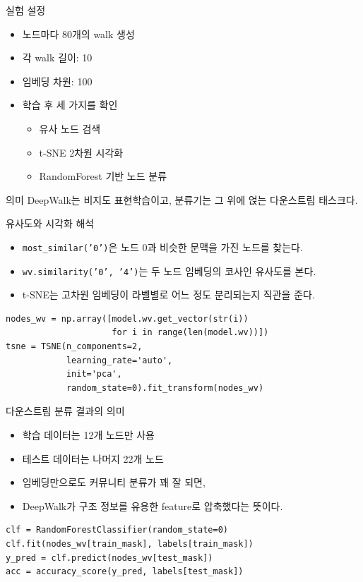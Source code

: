 \begin{frame}{실험 설정}
\begin{itemize}
  \item 노드마다 80개의 walk 생성
  \item 각 walk 길이: 10
  \item 임베딩 차원: 100
  \item 학습 후 세 가지를 확인
  \begin{itemize}
    \item 유사 노드 검색
    \item t-SNE 2차원 시각화
    \item RandomForest 기반 노드 분류
  \end{itemize}
\end{itemize}
\vspace{0.3em}
\begin{block}{의미}
DeepWalk는 비지도 표현학습이고, 분류기는 그 위에 얹는 다운스트림 태스크다.
\end{block}
\end{frame}

\begin{frame}[fragile]{유사도와 시각화 해석}
\begin{itemize}
  \item \texttt{most\_similar('0')}은 노드 0과 비슷한 문맥을 가진 노드를 찾는다.
  \item \texttt{wv.similarity('0', '4')}는 두 노드 임베딩의 코사인 유사도를 본다.
  \item t-SNE는 고차원 임베딩이 라벨별로 어느 정도 분리되는지 직관을 준다.
\end{itemize}
\vspace{0.4em}
\begin{lstlisting}
nodes_wv = np.array([model.wv.get_vector(str(i))
                     for i in range(len(model.wv))])
tsne = TSNE(n_components=2,
            learning_rate='auto',
            init='pca',
            random_state=0).fit_transform(nodes_wv)
\end{lstlisting}
\end{frame}

\begin{frame}[fragile]{다운스트림 분류 결과의 의미}
\begin{itemize}
  \item 학습 데이터는 12개 노드만 사용
  \item 테스트 데이터는 나머지 22개 노드
  \item 임베딩만으로도 커뮤니티 분류가 꽤 잘 되면,
  \item DeepWalk가 구조 정보를 유용한 feature로 압축했다는 뜻이다.
\end{itemize}
\vspace{0.4em}
\begin{lstlisting}
clf = RandomForestClassifier(random_state=0)
clf.fit(nodes_wv[train_mask], labels[train_mask])
y_pred = clf.predict(nodes_wv[test_mask])
acc = accuracy_score(y_pred, labels[test_mask])
\end{lstlisting}
\end{frame}

